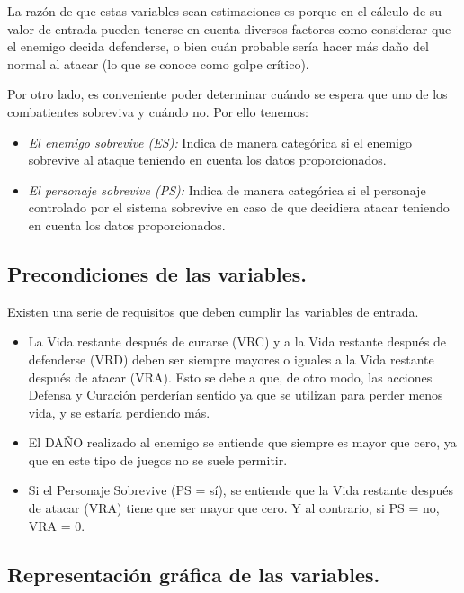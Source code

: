 La razón de que estas variables sean estimaciones es porque en el cálculo de su valor de entrada pueden tenerse en cuenta diversos factores como considerar que el enemigo decida defenderse, o bien cuán probable sería hacer más daño del normal al atacar (lo que se conoce como golpe crítico).

Por otro lado, es conveniente poder determinar cuándo se espera que uno de los combatientes sobreviva y cuándo no. Por ello tenemos:

\begin{itemize}
	\item \textit{El enemigo sobrevive (ES):} Indica de manera categórica si el enemigo sobrevive al ataque teniendo en cuenta los datos proporcionados.
	\item\textit{El personaje sobrevive (PS):} Indica de manera categórica si el personaje controlado por el sistema sobrevive en caso de que decidiera atacar teniendo en cuenta los datos proporcionados.
\end{itemize}

\subsection{Precondiciones de las variables.}
Existen una serie de requisitos que deben cumplir las variables de entrada.
\begin{itemize}
	\item La Vida restante después de curarse (VRC) y a la Vida restante después de defenderse (VRD) deben ser siempre mayores o iguales a la Vida restante después de atacar (VRA). Esto se debe a que, de otro modo, las acciones Defensa y Curación perderían sentido ya que se utilizan para perder menos vida, y se estaría perdiendo más.
	
	\item El DAÑO realizado al enemigo se entiende que siempre es mayor que cero, ya que en este tipo de juegos no se suele permitir.
	
	\item Si el Personaje Sobrevive (PS = sí), se entiende que la Vida restante después de atacar (VRA) tiene que ser mayor que cero. Y al contrario, si PS = no, VRA = 0.
	
\end{itemize}



\subsection{Representación gráfica de las variables.}
